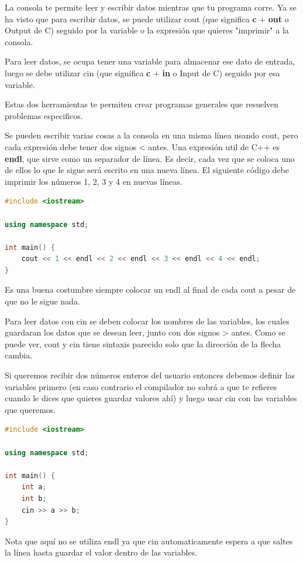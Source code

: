 \documentclass{article}
\begin{document}
La consola te permite leer y escribir datos mientras que tu programa corre. Ya se ha visto que para escribir datos, se puede utilizar cout (que significa \textbf{c} + \textbf{out} o Output de C) seguido por la variable o la expresión que quieres "imprimir" a la consola.

Para leer datos, se ocupa tener una variable para almacenar ese dato de entrada, luego se debe utilizar cin (que significa \textbf{c} + \textbf{in} o Input de C) seguido por esa variable.

Estas dos herramientas te permiten crear programas generales que resuelven problemas especificos.

Se pueden escribir varias cosas a la consola en una misma línea usando cout, pero cada expresión debe tener dos signos < antes. Una expresión util de C++ es \textbf{endl}, que sirve como un separador de línea. Es decir, cada vez que se coloca uno de ellos lo que le sigue será escrito en una nueva línea. El siguiente código debe imprimir los números 1, 2, 3 y 4 en nuevas líneas.

\begin{lstlisting}[language=C++, title=Uno a tres]
#include <iostream>

using namespace std;

int main() {
	cout << 1 << endl << 2 << endl << 3 << endl << 4 << endl;
}
\end{lstlisting}

Es una buena costumbre siempre colocar un endl al final de cada cout a pesar de que no le sigue nada.

Para leer datos con cin se deben colocar los nombres de las variables, los cuales guardaran los datos que se desean leer, junto con dos signos > antes. Como se puede ver, cout y cin tiene sintaxis parecido solo que la dirección de la flecha cambia.

Si queremos recibir dos números enteros del usuario entonces debemos definir las variables primero (en caso contrario el compilador no sabrá a que te refieres cuando le dices que quieres guardar valores ahí) y luego usar cin con las variables que queremos.

\begin{lstlisting}[language=C++, title=Leyendo dos enteros]
#include <iostream>

using namespace std;

int main() {
	int a;
	int b;
	cin >> a >> b;
}
\end{lstlisting}

Nota que aquí no se utiliza endl ya que cin automaticamente espera a que saltes la línea hasta guardar el valor dentro de las variables.
\end{document}
